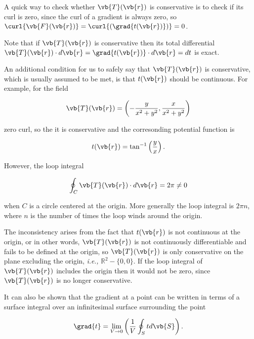 \documentclass[english,a4paper,12pt]{report}
\begin{document}
A quick way to check whether \(\vb{T} (\vb{r} )\) is conservative is to check if its curl is zero, since the curl of a gradient is always zero, so \(\curl{\vb{F} (\vb{r} )} = \curl{(\grad{t(\vb{r} )} )} =0 \).

Note that if \(\vb{T} (\vb{r} )\) is conservative then its total differential \(\vb{T} (\vb{r} ) \cdot d\vb{r} = \grad{t(\vb{r} )} \cdot d\vb{r} = dt \) is exact.  

An additional condition for us to safely say that \(\vb{T} (\vb{r} )\) is conservative, which is usually assumed to be met, is that \(t(\vb{r} )\) should be continuous. For example, for the field

\begin{equation}
	\vb{T} (\vb{r} ) = \left( -\frac{y}{x^2+y^2}, \frac{x}{x^2+y^2}   \right)
\end{equation}

zero curl, so the it is conservative and the corresonding potential function is 

\begin{equation}
	t(\vb{r} ) = \tan ^{-1} \left( \frac{y}{x}  \right).
\end{equation}

However, the loop integral 

\begin{equation}
	\oint_{C} \vb{T} (\vb{r} ) \cdot d\vb{r} = 2\pi \neq 0
\end{equation}

when \(C\) is a circle centered at the origin. More generally the loop integral is \(2\pi n\), where \(n\) is the number of times the loop winds around the origin. 

The inconsistency arises from the fact that \(t(\vb{r} )\) is not continuous at the origin, or in other words, \(\vb{T} (\vb{r} )\) is not continuously differentiable and fails to be defined at the origin, so \(\vb{T} (\vb{r} )\) is only conservative on the plane excluding the origin, \textit{i.e.,} \(\mathbb{R}^2 - \{0,0\}\). If the loop integral of \(\vb{T} (\vb{r} )\) includes the origin then it would not be zero, since \(\vb{T} (\vb{r} )\) is no longer conservative. 





It can also be shown that the gradient at a point can be written in terms of a surface integral over an infinitesimal surface surrounding the point

\begin{equation}
	\grad{t } = \lim_{V \to 0} \left( \frac{1}{V} \oint_{S} t  d\vb{S}  \right).
\end{equation}
\end{document}
